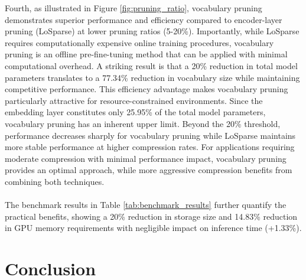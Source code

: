 \documentclass[twocolumn]{article}
\begin{document}
Fourth, as illustrated in Figure \ref{fig:pruning_ratio}, vocabulary pruning demonstrates superior performance and efficiency compared to encoder-layer pruning (LoSparse) at lower pruning ratios (5-20\%). Importantly, while LoSparse requires computationally expensive online training procedures, vocabulary pruning is an offline pre-fine-tuning method that can be applied with minimal computational overhead. A striking result is that a 20\% reduction in total model parameters translates to a 77.34\% reduction in vocabulary size while maintaining competitive performance. This efficiency advantage makes vocabulary pruning particularly attractive for resource-constrained environments. Since the embedding layer constitutes only 25.95\% of the total model parameters, vocabulary pruning has an inherent upper limit. Beyond the 20\% threshold, performance decreases sharply for vocabulary pruning while LoSparse maintains more stable performance at higher compression rates. For applications requiring moderate compression with minimal performance impact, vocabulary pruning provides an optimal approach, while more aggressive compression benefits from combining both techniques.
\\ \\
The benchmark results in Table \ref{tab:benchmark_results} further quantify the practical benefits, showing a 20\% reduction in storage size and 14.83\% reduction in GPU memory requirements with negligible impact on inference time (+1.33\%).




\section{Conclusion}



    
\end{document}
